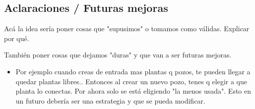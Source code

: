 \subsection{Aclaraciones / Futuras mejoras}

\par Acá la idea sería poner cosas que "supusimos" o tomamos como válidas. Explicar por qué.
\par También poner cosas que dejamos "duras" y que van a ser futuras mejoras.


\begin{itemize}
  \item Por ejemplo cuando creas de entrada mas plantas q pozos, te pueden llegar a quedar plantas libres.. Entonces al crear un nuevo pozo, tenes q elegir a que planta lo conectas. Por ahora solo se está eligiendo "la menos usada". Esto en un futuro debería ser una estrategia y que se pueda modificar.
\end{itemize}

